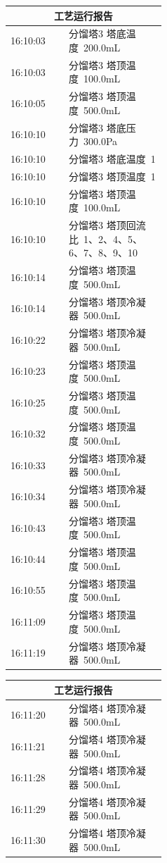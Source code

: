 \documentclass[UTF8,10pt,a4paper,fontset=fandol]{ctexart}
\begin{document}
\begin{center}
\begin{tabular}{|p{0.12\linewidth}|p{0.32\linewidth}|}
\hline
\multicolumn{2}{c}{\textbf{工艺运行报告}}\\
\hline
16:10:03 & 分馏塔3 塔底温度~200.0mL\\ \hline
16:10:03 & 分馏塔3 塔顶温度~100.0mL\\ \hline
16:10:05 & 分馏塔3 塔顶温度~500.0mL\\ \hline
16:10:10 & 分馏塔3 塔底压力~300.0Pa\\ \hline
16:10:10 & 分馏塔3 塔底温度~1\\ \hline
16:10:10 & 分馏塔3 塔顶温度~1\\ \hline
16:10:10 & 分馏塔3 塔顶温度~100.0mL\\ \hline
16:10:10 & 分馏塔3 塔顶回流比~1、2、4、5、6、7、8、9、10\\ \hline
16:10:14 & 分馏塔3 塔顶温度~500.0mL\\ \hline
16:10:14 & 分馏塔3 塔顶冷凝器~500.0mL\\ \hline
16:10:22 & 分馏塔3 塔顶冷凝器~500.0mL\\ \hline
16:10:23 & 分馏塔3 塔顶温度~500.0mL\\ \hline
16:10:25 & 分馏塔3 塔顶温度~500.0mL\\ \hline
16:10:32 & 分馏塔3 塔顶温度~500.0mL\\ \hline
16:10:33 & 分馏塔3 塔顶冷凝器~500.0mL\\ \hline
16:10:34 & 分馏塔3 塔顶冷凝器~500.0mL\\ \hline
16:10:43 & 分馏塔3 塔顶温度~500.0mL\\ \hline
16:10:44 & 分馏塔3 塔顶温度~500.0mL\\ \hline
16:10:55 & 分馏塔3 塔顶温度~500.0mL\\ \hline
16:11:09 & 分馏塔3 塔顶温度~500.0mL\\ \hline
16:11:19 & 分馏塔3 塔顶冷凝器~500.0mL\\ \hline
\end{tabular}
\hfill
\begin{tabular}{|p{0.12\linewidth}|p{0.32\linewidth}|}
\hline
\multicolumn{2}{c}{\textbf{工艺运行报告}}\\
\hline
16:11:20 & 分馏塔4 塔顶冷凝器~500.0mL\\ \hline
16:11:21 & 分馏塔4 塔顶冷凝器~500.0mL\\ \hline
16:11:28 & 分馏塔4 塔顶冷凝器~500.0mL\\ \hline
16:11:29 & 分馏塔4 塔顶冷凝器~500.0mL\\ \hline
16:11:30 & 分馏塔4 塔顶冷凝器~500.0mL\\ \hline

\end{tabular}
\end{center}
\end{document}
